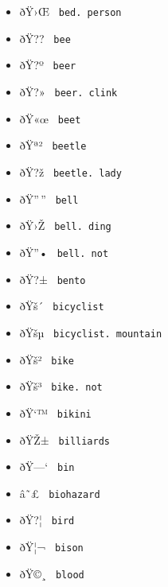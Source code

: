 \begin{itemize}
\item
  \label{symbol-bed.person}{{ ðŸ›Œ }
  \texttt{\ bed.\ person\ }}
\item
  \label{symbol-bee}{{ ðŸ?? } \texttt{\ bee\ }}
\item
  \label{symbol-beer}{{ ðŸ?º } \texttt{\ beer\ }}
\item
  \label{symbol-beer.clink}{{ ðŸ?» }
  \texttt{\ beer.\ clink\ }}
\item
  \label{symbol-beet}{{ ðŸ«œ } \texttt{\ beet\ }}
\item
  \label{symbol-beetle}{{ ðŸª² } \texttt{\ beetle\ }}
\item
  \label{symbol-beetle.lady}{{ ðŸ?ž }
  \texttt{\ beetle.\ lady\ }}
\item
  \label{symbol-bell}{{ ðŸ''\,'' } \texttt{\ bell\ }}
\item
  \label{symbol-bell.ding}{{ ðŸ›Ž }
  \texttt{\ bell.\ ding\ }}
\item
  \label{symbol-bell.not}{{ ðŸ''• }
  \texttt{\ bell.\ not\ }}
\item
  \label{symbol-bento}{{ ðŸ?± } \texttt{\ bento\ }}
\item
  \label{symbol-bicyclist}{{ ðŸš´ }
  \texttt{\ bicyclist\ }}
\item
  \label{symbol-bicyclist.mountain}{{ ðŸšµ }
  \texttt{\ bicyclist.\ mountain\ }}
\item
  \label{symbol-bike}{{ ðŸš² } \texttt{\ bike\ }}
\item
  \label{symbol-bike.not}{{ ðŸš³ }
  \texttt{\ bike.\ not\ }}
\item
  \label{symbol-bikini}{{ ðŸ`™ } \texttt{\ bikini\ }}
\item
  \label{symbol-billiards}{{ ðŸŽ± }
  \texttt{\ billiards\ }}
\item
  \label{symbol-bin}{{ ðŸ---` } \texttt{\ bin\ }}
\item
  \label{symbol-biohazard}{{ â˜£ }
  \texttt{\ biohazard\ }}
\item
  \label{symbol-bird}{{ ðŸ?¦ } \texttt{\ bird\ }}
\item
  \label{symbol-bison}{{ ðŸ¦¬ } \texttt{\ bison\ }}
\item
  \label{symbol-blood}{{ ðŸ©¸ } \texttt{\ blood\ }}

\end{itemize}
